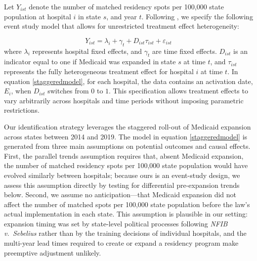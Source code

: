 Let $Y_{ist}$ denote the number of matched residency spots per 100,000 state population at hospital $i$ in state $s$, and year $t$. Following \textcite{borusyak2024revisiting}, we specify the following event study model that allows for unrestricted treatment effect heterogeneity:
	
\begin{equation}\label{staggeredmodel}
		Y_{ist} = \lambda_i  + \gamma_t + D_{ist}\tau_{ist} + \varepsilon_{ist}
\end{equation}
where $\lambda_i$ represents hospital fixed effects, and $\gamma_t$ are time fixed effects. $D_{ist}$ is an indicator equal to one if Medicaid was expanded in state $s$ at time $t$, and $\tau_{ist}$ represents the fully heterogeneous treatment effect for hospital $i$ at time $t$. In equation \eqref{staggeredmodel}, for each hospital, the data contains an activation date, $E_i$, when $D_{ist}$ switches from $0$ to $1$. This specification allows treatment effects to vary arbitrarily across hospitals and time periods without imposing parametric restrictions.
 
Our identification strategy leverages the staggered roll-out of Medicaid expansion across states between 2014 and 2019. The model in equation \eqref{staggeredmodel} is generated from three main assumptions on potential outcomes and causal effects. First, the parallel trends assumption requires that, absent Medicaid expansion, the number of matched residency spots per 100,000 state population would have evolved similarly between hospitals; because ours is an event-study design, we assess this assumption directly by testing for differential pre-expansion trends below. Second, we assume no anticipation---that Medicaid expansion did not affect the number of matched spots per 100,000 state population before the law's actual implementation in each state. This assumption is plausible in our setting: expansion timing was set by state-level political processes following \textit{NFIB v.\ Sebelius} rather than by the training decisions of individual hospitals, and the multi-year lead times required to create or expand a residency program make preemptive adjustment unlikely.

